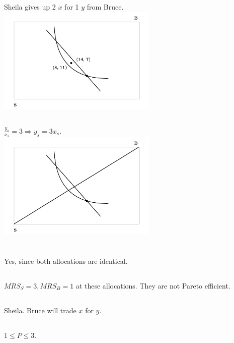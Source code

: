 \documentclass{article}
\begin{document}
	\subsection[d]{}
		Sheila gives up 2 $x$ for 1 $y$ from Bruce. 
		\\ \includegraphics[height=2in]{Charts/1d}
	\subsection[e]{}
		$\frac{y_s}{x_s} = 3 \Rightarrow y_s = 3x_s.$ \\
		\includegraphics[height=2in]{Charts/1e}
\section[2]{}
	\subsection[a]{}
		Yes, since both allocations are identical. 
	\subsection[b]{}
		$MRS_S = 3, MRS_B = 1$ at these allocations. They are not Pareto efficient.
	\subsection[c]{}
		Sheila. Bruce will trade $x$ for $y$. 
	\subsection[d]{}
		$1 \leq P \leq 3$.
\end{document}
